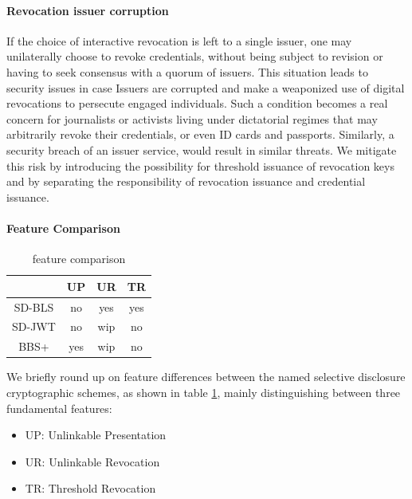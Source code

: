 

\paragraph{Revocation issuer corruption}

If the choice of interactive revocation is left to a single issuer,
one may unilaterally choose to revoke credentials, without being
subject to revision or having to seek consensus with a quorum of
issuers. This situation leads to security issues in case Issuers are
corrupted and make a weaponized use of digital revocations to
persecute engaged individuals. Such a condition becomes a real concern
for journalists or activists living under dictatorial regimes that may
arbitrarily revoke their credentials, or even ID cards and
passports. Similarly, a security breach of an issuer service, would
result in similar threats. We mitigate this risk by introducing the
possibility for threshold issuance of revocation keys and by
separating the responsibility of revocation issuance and credential
issuance.

\paragraph{Feature Comparison}

\begin{table}[]
\centering
\begin{tabular}{cccc}
\hline
       & \textbf{UP} & \textbf{UR} & \textbf{TR} \\ \hline
SD-BLS & no          & yes         & yes         \\ \hline
SD-JWT & no          & wip         & no          \\ \hline
BBS+   & yes         & wip         & no          \\ \hline
\end{tabular}
\caption{feature comparison}
\label{tab:features}
\end{table}

We briefly round up on feature differences between the named selective
disclosure cryptographic schemes, as shown in table
\ref{tab:features}, mainly distinguishing between three fundamental
features:
\begin{itemize}
\item UP: Unlinkable Presentation
\item UR: Unlinkable Revocation
\item TR: Threshold Revocation
\end{itemize}

